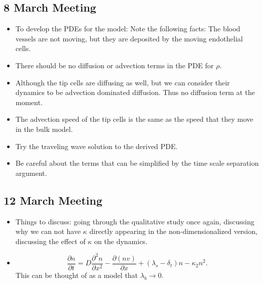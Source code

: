 \subsection{8 March Meeting}
\begin{itemize}
	\item To develop the PDEs for the model: Note the following facts: The blood vessels are not moving, but they are deposited by the moving endothelial cells.
	\item There should be no diffusion or advection terms in the PDE for $ \rho $.
	\item Although the tip cells are diffusing as well, but we can consider their dynamics to be advection dominated diffusion. Thus no diffusion term at the moment.
	\item The advection speed of the tip cells is the same as the speed that they move in the bulk model.
	\item Try the traveling wave solution to the derived PDE.
	\item Be careful about the terms that can be simplified by the time scale separation argument. 
\end{itemize}

\subsection{12 March Meeting}
\begin{itemize}
	\item Things to discuss: going through the qualitative study once again, discussing why we can not have $ \kappa $ directly appearing in the non-dimensionalized version, discussing the effect of $ \kappa $ on the dynamics.
	
	\item 
	\[ \frac{\partial n}{\partial t} = D \frac{\partial^2 n}{\partial x^2} - \frac{\partial(nv)}{\partial x} + (\lambda_s - \delta_t)n - \kappa_2 n^2. \]
	This can be thought of as a model that $ \lambda_b \to 0 $.
\end{itemize}

